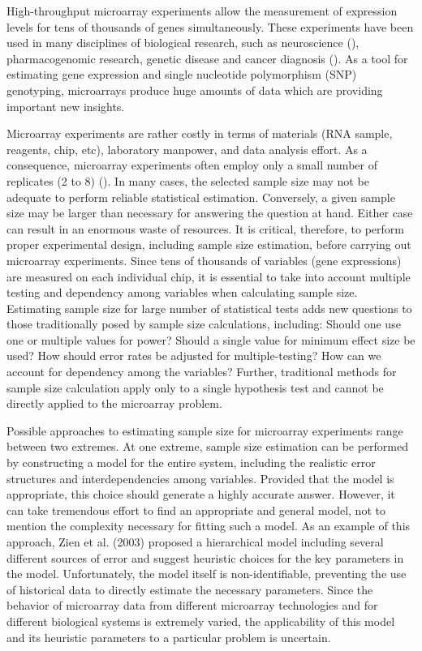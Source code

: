 \documentclass{bioinfo}
\begin{document}
High-throughput microarray experiments allow the measurement of
expression levels for tens of thousands of genes simultaneously.
These experiments have been used in many disciplines of biological
research, such as neuroscience (\citealp{Mandel03}), pharmacogenomic
research, genetic disease and cancer diagnosis (\citealp{Heller02}).
As a tool for estimating gene expression and single nucleotide
polymorphism (SNP) genotyping, microarrays produce huge amounts of
data which are providing important new insights.

Microarray experiments are rather costly in terms of materials (RNA
sample, reagents, chip, etc), laboratory manpower, and data analysis
effort.  As a consequence, microarray experiments often employ only
a small number of replicates (2 to 8) (\citealp{Speed03}). In many
cases, the selected sample size may not be adequate to perform
reliable statistical estimation.  Conversely, a given sample size
may be larger than necessary for answering the question at hand.
Either case can result in an enormous waste of resources. It is
critical, therefore, to perform proper experimental design,
including sample size estimation, before carrying out microarray
experiments. Since tens of thousands of variables (gene expressions)
are measured on each individual chip, it is essential to take into
account multiple testing and dependency among variables when
calculating sample size.  Estimating sample size for large number of
statistical tests adds new questions to those traditionally posed by
sample size calculations, including: Should one use one or multiple
values for power? Should a single value for minimum effect size be
used?  How should error rates be adjusted for multiple-testing?  How
can we account for dependency among the variables?  Further,
traditional methods for sample size calculation apply only to a
single hypothesis test and cannot be directly applied to the
microarray problem.

Possible approaches to estimating sample size for microarray
experiments range between two extremes. At one extreme, sample size
estimation can be performed by constructing a model for the entire
system, including the realistic error structures and
interdependencies among variables. Provided that the model is
appropriate, this choice should generate a highly accurate answer.
However, it can take tremendous effort to find an appropriate and
general model, not to mention the complexity necessary for fitting
such a model. As an example of this approach, Zien et al. (2003)
proposed a hierarchical model including several different sources of
error and suggest heuristic choices for the key parameters in the
model. Unfortunately, the model itself is non-identifiable,
preventing the use of historical data to directly estimate
the necessary parameters.  Since the behavior of microarray data from
different microarray technologies and for different biological
systems is extremely varied, the applicability of this model and its
heuristic parameters to a particular problem is uncertain.
\end{document}
